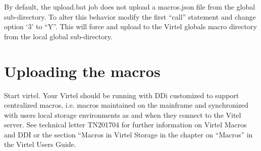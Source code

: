 \documentclass[letterpaper,10pt,english]{sphinxmanual}
\begin{document}
By default, the upload.bat job does not upload a macros.json file from the global sub-directory. To alter this behavior modify the first “call” statement and change option ‘3’ to “Y”. This will force and upload to the Virtel globals macro directory from the local global sub-directory.

\begin{sphinxVerbatim}[commandchars=\\\{\}]
 
       
     
    
     
     
 
          
          
\end{sphinxVerbatim}


\section{Uploading the macros}
\label{\detokenize{TN201903:uploading-the-macros}}
Start virtel. Your Virtel should be running with DDi customized to support centralized macros, i.e. macros maintained on the mainframe and synchronized with users local storage environments as and when they connect to the Vitel server. See technical letter TN201704 for further information on Virtel Macros and DDI or the section “Macros in Virtel Storage in the chapter on “Macros” in the Virtel Users Guide.
\end{document}
